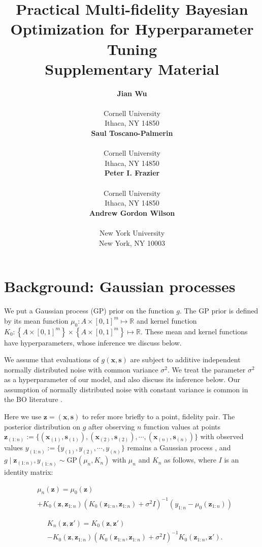\documentclass[letterpaper]{article}
\title{Practical Multi-fidelity Bayesian Optimization for Hyperparameter Tuning\\Supplementary Material}
\author{ {\bf Jian Wu}\\
\orie \\
Cornell University\\
Ithaca, NY 14850 \\
\And
{\bf Saul Toscano-Palmerin}  \\
\orie \\
Cornell University\\
Ithaca, NY 14850 \\
\And
{\bf Peter I. Frazier}   \\
\orie \\
Cornell University\\
Ithaca, NY 14850 \\
\And
{\bf Andrew Gordon Wilson}\\
\courant\\
New York University\\
New York, NY 10003
}
\newcommand{\x}{\mathbf{x}}
\newcommand{\s}{\mathbf{s}}
\newcommand{\A}{A}
\newcommand{\z}{\mathbf{z}}
\theoremstyle{definition}
\numberwithin{equation}{section}
\begin{document}
\maketitle


\section{Background: Gaussian processes}
\label{sect:gp}


We put a Gaussian process (GP) prior \citep{rasmussen2006gaussian} on the function $g$.  
The GP prior is defined by its mean function $\mu_{0}: \A \times [0, 1]^m \mapsto \mathbb{R}$ and kernel function $K_{0}: \left\{\A \times [0, 1]^m\right\} \times \left\{\A \times [0, 1]^m \right\} \mapsto \mathbb{R}$.  These mean and kernel functions have hyperparameters, whose inference we discuss below.

We assume that evaluations of $g(\x,\s)$ are subject to additive independent normally distributed noise with common variance $\sigma^2$.
We treat the parameter $\sigma^2$ as a hyperparameter of our model, and also discuss its inference below.  Our assumption of normally distributed noise with constant variance is common in the BO literature \citep{klein2016fast}. 

Here we use $\z = (\x,\s)$ to refer more briefly to a point, fidelity pair.  
The posterior distribution on $g$ after observing $n$ function values at points $\z_{(1:n)} := \{(\x_{(1)}, \s_{(1)}), (\x_{(2)}, \s_{(2)}), \cdots, (\x_{(n)}, \s_{(n)})\}$ with observed values $y_{(1:n)} := \{y_{(1)}, y_{(2)}, \cdots, y_{(n)}\}$ remains a Gaussian process \citep{rasmussen2006gaussian}, and $g \mid \z_{(1:n)}, y_{(1:n)} \sim \text{GP}(\mu_n, K_n)$ with $\mu_n$ and $K_n$ as follows, where $I$ is an identity matrix:

\begin{equation*}
\begin{split}
&\mu_n(\z) = \mu_{0}(\z) \\
&+ K_{0}(\z,\z_{1:n}) 
\left(K_{0}(\z_{1:n},\z_{1:n})+ \sigma^2 I \right)^{-1}  
(y_{1:n}-\mu_{0}(\z_{1:n}))
\end{split}
\end{equation*}

\begin{equation*}
\begin{split}
&K_{n}(\z, \z') =  K_{0}(\z,\z')\\
&- K_{0}(\z,\z_{1:n})  \left(K_{0}(\z_{1:n},\z_{1:n}) +\sigma^2 I\right)^{-1} K_{0}(\z_{1:n},\z').
\end{split}
\end{equation*}
\end{document}
